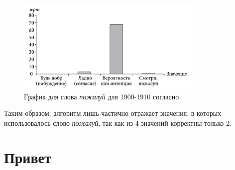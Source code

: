 \begin{figure}[H]
    \centering %
    \includegraphics[width=0.8\textwidth]{img/book/pozhaluj/1900-1910}
    \caption{График для слова \textit{пожалуй} для 1900-1910 согласно~\cite{TwoCenturies}}
    \label{fig:TwoCentrutiesPozhaluj2}
\end{figure}

Таким образом, алгоритм лишь частично отражает значения, в которых использовалось
слово \textit{пожалуй}, так как из 4 значений корректны только 2.

\section*{Привет}

